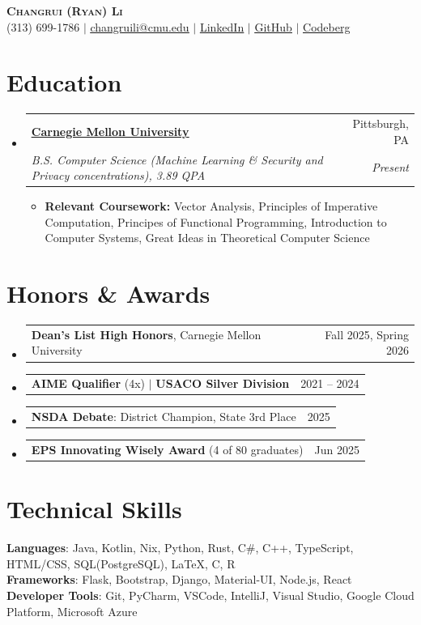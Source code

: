 \documentclass[letterpaper,11pt]{article}
\makeatletter
\newcommand{\resumeSubheading}[4]{
  \vspace{-2pt}\item
    \begin{tabular*}{0.97\textwidth}[t]{l@{\extracolsep{\fill}}r}
      \textbf{#1} & #2 \\
      \textit{\small#3} & \textit{\small #4} \\
    \end{tabular*}\vspace{-7pt}
}
\newcommand{\resumeAwardHeading}[2]{
    \item
    \begin{tabular*}{0.97\textwidth}{l@{\extracolsep{\fill}}r}
      \small#1 & #2 \\
    \end{tabular*}\vspace{-7pt}
}
\newcommand{\resumeSubHeadingListStart}{\begin{itemize}[leftmargin=0.15in, label={}]}
\newcommand{\resumeSubHeadingListEnd}{\end{itemize}}
\newcommand{\resumeItemListStart}{\begin{itemize}}
\newcommand{\resumeItemListEnd}{\end{itemize}\vspace{-5pt}}
\makeatother
\begin{document}
\begin{center}
    \textbf{\Huge \scshape Changrui (Ryan) Li} \\ \vspace{1pt}
    \small (313) 699-1786 $|$ \href{mailto:changruili@cmu.edu}{\underline{changruili@cmu.edu}} $|$ \href{https://www.linkedin.com/in/ryan-li-ab139919b/}{\underline{LinkedIn}} $|$
    \href{https://github.com/thesuperRL}{\underline{GitHub}} $|$
    \href{https://codeberg.org/thesuperRL}{\underline{Codeberg}}
\end{center}

\section{Education}
  \resumeSubHeadingListStart
      \resumeSubheading
              {\href{https://www.cmu.edu/}{\underline{Carnegie Mellon University}} }{Pittsburgh, PA}
              {B.S. Computer Science (Machine Learning \& Security and Privacy concentrations), 3.89 QPA}{Present}
              \resumeItemListStart 
                  \item{
                    \textbf{Relevant Coursework:} Vector Analysis, Principles of Imperative Computation, Principes of Functional Programming, Introduction to Computer Systems, Great Ideas in Theoretical Computer Science
                    }
              \resumeItemListEnd
          
  \resumeSubHeadingListEnd

\section{Honors \& Awards}
  \resumeSubHeadingListStart
    \resumeAwardHeading{\textbf{Dean's List High Honors}, Carnegie Mellon University}{Fall 2025, Spring 2026}
    \resumeAwardHeading{\textbf{AIME Qualifier} (4x) $|$ \textbf{USACO Silver Division}}{2021 -- 2024}
    \resumeAwardHeading{\textbf{NSDA Debate}: District Champion, State 3rd Place}{2025}
    \resumeAwardHeading{\textbf{EPS Innovating Wisely Award} (4 of 80 graduates)}{Jun 2025}
  \resumeSubHeadingListEnd

\section{Technical Skills}
 \begin{itemize}[leftmargin=0.15in, label={}]
    \small{\item{
     \textbf{Languages}{: Java, Kotlin, Nix, Python, Rust, C\#, C++, TypeScript, HTML/CSS, SQL(PostgreSQL), \LaTeX, C, R} \\
     \textbf{Frameworks}{: Flask, Bootstrap, Django, Material-UI, Node.js, React} \\
     \textbf{Developer Tools}{: Git, PyCharm, VSCode, IntelliJ, Visual Studio, Google Cloud Platform, Microsoft Azure} \\
    }}
 \end{itemize}
\end{document}
